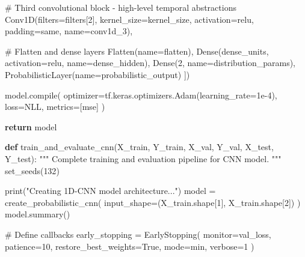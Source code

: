 \documentclass[
  letterpaper,
  DIV=11,
  numbers=noendperiod]{scrreprt}
\newenvironment{Shaded}{\begin{snugshade}}{\end{snugshade}}
\newcommand{\BuiltInTok}[1]{\textcolor[rgb]{0.00,0.23,0.31}{#1}}
\newcommand{\CommentTok}[1]{\textcolor[rgb]{0.37,0.37,0.37}{#1}}
\newcommand{\ControlFlowTok}[1]{\textcolor[rgb]{0.00,0.23,0.31}{\textbf{#1}}}
\newcommand{\DecValTok}[1]{\textcolor[rgb]{0.68,0.00,0.00}{#1}}
\newcommand{\FloatTok}[1]{\textcolor[rgb]{0.68,0.00,0.00}{#1}}
\newcommand{\KeywordTok}[1]{\textcolor[rgb]{0.00,0.23,0.31}{\textbf{#1}}}
\newcommand{\NormalTok}[1]{\textcolor[rgb]{0.00,0.23,0.31}{#1}}
\newcommand{\OperatorTok}[1]{\textcolor[rgb]{0.37,0.37,0.37}{#1}}
\newcommand{\StringTok}[1]{\textcolor[rgb]{0.13,0.47,0.30}{#1}}
\newcommand{\VariableTok}[1]{\textcolor[rgb]{0.07,0.07,0.07}{#1}}
\begin{document}
\begin{Shaded}
\begin{Highlighting}[]
        \CommentTok{\# Third convolutional block {-} high{-}level temporal abstractions}
\NormalTok{        Conv1D(filters}\OperatorTok{=}\NormalTok{filters[}\DecValTok{2}\NormalTok{], kernel\_size}\OperatorTok{=}\NormalTok{kernel\_size,}
\NormalTok{               activation}\OperatorTok{=}\StringTok{\textquotesingle{}relu\textquotesingle{}}\NormalTok{, padding}\OperatorTok{=}\StringTok{\textquotesingle{}same\textquotesingle{}}\NormalTok{, name}\OperatorTok{=}\StringTok{\textquotesingle{}conv1d\_3\textquotesingle{}}\NormalTok{),}

        \CommentTok{\# Flatten and dense layers}
\NormalTok{        Flatten(name}\OperatorTok{=}\StringTok{\textquotesingle{}flatten\textquotesingle{}}\NormalTok{),}
\NormalTok{        Dense(dense\_units, activation}\OperatorTok{=}\StringTok{\textquotesingle{}relu\textquotesingle{}}\NormalTok{, name}\OperatorTok{=}\StringTok{\textquotesingle{}dense\_hidden\textquotesingle{}}\NormalTok{),}
\NormalTok{        Dense(}\DecValTok{2}\NormalTok{, name}\OperatorTok{=}\StringTok{\textquotesingle{}distribution\_params\textquotesingle{}}\NormalTok{),}
\NormalTok{        ProbabilisticLayer(name}\OperatorTok{=}\StringTok{\textquotesingle{}probabilistic\_output\textquotesingle{}}\NormalTok{)}
\NormalTok{    ])}

\NormalTok{    model.}\BuiltInTok{compile}\NormalTok{(}
\NormalTok{        optimizer}\OperatorTok{=}\NormalTok{tf.keras.optimizers.Adam(learning\_rate}\OperatorTok{=}\FloatTok{1e{-}4}\NormalTok{),}
\NormalTok{        loss}\OperatorTok{=}\NormalTok{NLL,}
\NormalTok{        metrics}\OperatorTok{=}\NormalTok{[}\StringTok{\textquotesingle{}mse\textquotesingle{}}\NormalTok{]}
\NormalTok{    )}

    \ControlFlowTok{return}\NormalTok{ model}

\KeywordTok{def}\NormalTok{ train\_and\_evaluate\_cnn(X\_train, Y\_train, X\_val, Y\_val, X\_test, Y\_test):}
    \CommentTok{"""}
\CommentTok{    Complete training and evaluation pipeline for CNN model.}
\CommentTok{    """}
\NormalTok{    set\_seeds(}\DecValTok{132}\NormalTok{)}

    \BuiltInTok{print}\NormalTok{(}\StringTok{"Creating 1D{-}CNN model architecture..."}\NormalTok{)}
\NormalTok{    model }\OperatorTok{=}\NormalTok{ create\_probabilistic\_cnn(}
\NormalTok{        input\_shape}\OperatorTok{=}\NormalTok{(X\_train.shape[}\DecValTok{1}\NormalTok{], X\_train.shape[}\DecValTok{2}\NormalTok{])}
\NormalTok{    )}
\NormalTok{    model.summary()}

    \CommentTok{\# Define callbacks}
\NormalTok{    early\_stopping }\OperatorTok{=}\NormalTok{ EarlyStopping(}
\NormalTok{        monitor}\OperatorTok{=}\StringTok{\textquotesingle{}val\_loss\textquotesingle{}}\NormalTok{,}
\NormalTok{        patience}\OperatorTok{=}\DecValTok{10}\NormalTok{,}
\NormalTok{        restore\_best\_weights}\OperatorTok{=}\VariableTok{True}\NormalTok{,}
\NormalTok{        mode}\OperatorTok{=}\StringTok{\textquotesingle{}min\textquotesingle{}}\NormalTok{,}
\NormalTok{        verbose}\OperatorTok{=}\DecValTok{1}
\NormalTok{    )}


\end{Highlighting}
\end{Shaded}
\end{document}
